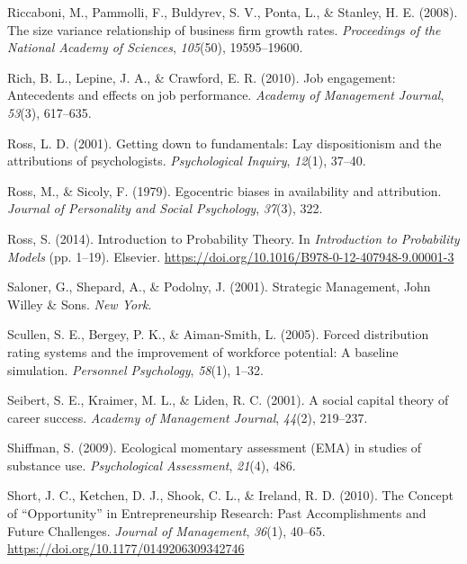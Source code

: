 \documentclass[english,,man]{apa6}
\begin{document}
\leavevmode\hypertarget{ref-riccaboni_size_2008}{}%
Riccaboni, M., Pammolli, F., Buldyrev, S. V., Ponta, L., \& Stanley, H. E. (2008). The size variance relationship of business firm growth rates. \emph{Proceedings of the National Academy of Sciences}, \emph{105}(50), 19595--19600.

\leavevmode\hypertarget{ref-rich_job_2010}{}%
Rich, B. L., Lepine, J. A., \& Crawford, E. R. (2010). Job engagement: Antecedents and effects on job performance. \emph{Academy of Management Journal}, \emph{53}(3), 617--635.

\leavevmode\hypertarget{ref-ross_getting_2001}{}%
Ross, L. D. (2001). Getting down to fundamentals: Lay dispositionism and the attributions of psychologists. \emph{Psychological Inquiry}, \emph{12}(1), 37--40.

\leavevmode\hypertarget{ref-ross_egocentric_1979}{}%
Ross, M., \& Sicoly, F. (1979). Egocentric biases in availability and attribution. \emph{Journal of Personality and Social Psychology}, \emph{37}(3), 322.

\leavevmode\hypertarget{ref-ross_introduction_2014}{}%
Ross, S. (2014). Introduction to Probability Theory. In \emph{Introduction to Probability Models} (pp. 1--19). Elsevier. \url{https://doi.org/10.1016/B978-0-12-407948-9.00001-3}

\leavevmode\hypertarget{ref-saloner_strategic_2001}{}%
Saloner, G., Shepard, A., \& Podolny, J. (2001). Strategic Management, John Willey \& Sons. \emph{New York}.

\leavevmode\hypertarget{ref-scullen_forced_2005}{}%
Scullen, S. E., Bergey, P. K., \& Aiman-Smith, L. (2005). Forced distribution rating systems and the improvement of workforce potential: A baseline simulation. \emph{Personnel Psychology}, \emph{58}(1), 1--32.

\leavevmode\hypertarget{ref-seibert_social_2001}{}%
Seibert, S. E., Kraimer, M. L., \& Liden, R. C. (2001). A social capital theory of career success. \emph{Academy of Management Journal}, \emph{44}(2), 219--237.

\leavevmode\hypertarget{ref-shiffman_ecological_2009}{}%
Shiffman, S. (2009). Ecological momentary assessment (EMA) in studies of substance use. \emph{Psychological Assessment}, \emph{21}(4), 486.

\leavevmode\hypertarget{ref-short_concept_2010}{}%
Short, J. C., Ketchen, D. J., Shook, C. L., \& Ireland, R. D. (2010). The Concept of ``Opportunity'' in Entrepreneurship Research: Past Accomplishments and Future Challenges. \emph{Journal of Management}, \emph{36}(1), 40--65. \url{https://doi.org/10.1177/0149206309342746}
\end{document}

